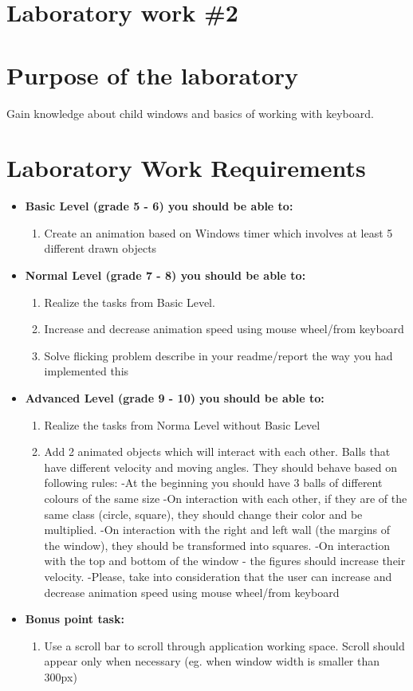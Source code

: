 \section*{Laboratory work \#2}

\section{Purpose of the laboratory}
Gain knowledge about child windows and basics of working with keyboard.
\section{Laboratory Work Requirements}
\begin{itemize}
\item \textbf{Basic Level (grade 5 - 6) you should be able to:}
	\begin{enumerate}
	\item Create an animation based on Windows timer which involves at least 5 different drawn objects
      \end{enumerate}
\item \textbf{Normal Level (grade 7 - 8) you should be able to:}
      \begin{enumerate}
     \item Realize the tasks from Basic Level.
    \item Increase and decrease animation speed using mouse wheel/from keyboard
    \item Solve flicking problem describe in your readme/report the way you had implemented this
          \end{enumerate}
\item \textbf{Advanced Level (grade 9 - 10) you should be able to:}
      \begin{enumerate}
    \item Realize the tasks from Norma Level without Basic Level
    \item Add 2 animated objects which will interact with each other. Balls that have different velocity and moving angles. They should behave based on following rules:
    	 -At the beginning you should have 3 balls of different colours of the same size
		 -On interaction with each other, if they are of the same class (circle, square), they should change their color and be multiplied.
		 -On interaction with the right and left wall (the margins of the window), they should be transformed into squares.
		 -On interaction with the top and bottom of the window - the figures should increase their velocity.
		 -Please, take into consideration that the user can increase and decrease animation speed using mouse wheel/from keyboard
          \end{enumerate}
\item \textbf{Bonus point task:}
      \begin{enumerate}
    \item Use a scroll bar to scroll through application working space. Scroll should appear only when necessary (eg. when window width is smaller than 300px)
    	\end{enumerate}
  \end{itemize}  

\clearpage